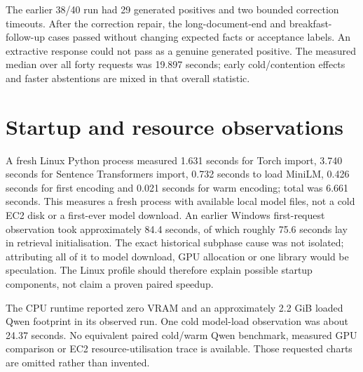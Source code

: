 The earlier 38/40 run had 29 generated positives and two bounded correction timeouts. After the correction repair, the long-document-end and breakfast-follow-up cases passed without changing expected facts or acceptance labels. An extractive response could not pass as a genuine generated positive. The measured median over all forty requests was 19.897 seconds; early cold/contention effects and faster abstentions are mixed in that overall statistic.
\section{Startup and resource observations}
A fresh Linux Python process measured 1.631 seconds for Torch import, 3.740 seconds for Sentence Transformers import, 0.732 seconds to load MiniLM, 0.426 seconds for first encoding and 0.021 seconds for warm encoding; total was 6.661 seconds. This measures a fresh process with available local model files, not a cold EC2 disk or a first-ever model download.
An earlier Windows first-request observation took approximately 84.4 seconds, of which roughly 75.6 seconds lay in retrieval initialisation. The exact historical subphase cause was not isolated; attributing all of it to model download, GPU allocation or one library would be speculation. The Linux profile should therefore explain possible startup components, not claim a proven paired speedup.

The CPU runtime reported zero VRAM and an approximately 2.2 GiB loaded Qwen footprint in its observed run. One cold model-load observation was about 24.37 seconds. No equivalent paired cold/warm Qwen benchmark, measured GPU comparison or EC2 resource-utilisation trace is available. Those requested charts are omitted rather than invented.
\FloatBarrier
\endgroup
